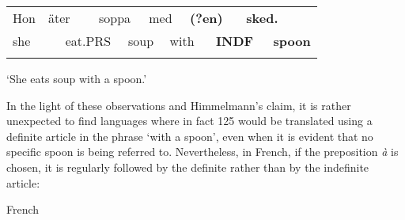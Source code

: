 \begin{tabular}{llllllllllll}
\lsptoprule
Hon & \multicolumn{2}{l}{äter

} & \multicolumn{2}{l}{soppa

} & \multicolumn{2}{l}{med

} & \multicolumn{2}{l}{{\bfseries (?en)}

} & \multicolumn{2}{l}{{\bfseries sked.}

} & \\
\multicolumn{2}{l}{she

} & \multicolumn{2}{l}{eat.PRS

} & \multicolumn{2}{l}{soup

} & \multicolumn{2}{l}{with

} & \multicolumn{2}{l}{{\bfseries INDF}

} & \multicolumn{2}{l}{{\bfseries spoon}

}\\
\lspbottomrule
\end{tabular}

\begin{styleTranslation}
‘She eats soup with a spoon.’

\end{styleTranslation}

\begin{styleBodyTextFirst}
In the light of these observations and Himmelmann’s claim, it is rather unexpected to find languages where in fact 125 would be translated using a definite article in the phrase ‘with a spoon’, even when it is evident that no specific spoon is being referred to. Nevertheless, in French, if the preposition \textit{à} is chosen, it is regularly followed by the definite rather than by the indefinite article:

\end{styleBodyTextFirst}

\begin{listWWNumileveli}
\item 

\begin{styleExample}
French

\end{styleExample}

\end{listWWNumileveli}

